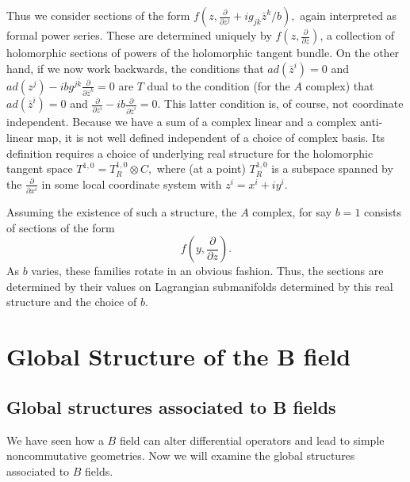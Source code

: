 \documentclass[a4paper,11pt]{amsart}
\begin{document}
Thus we consider sections of the form 
$f(z,\frac{\partial}{\partial z^j}+ig_{j\bar k}\bar z^k/b),$ 
again interpreted as formal power series.
These are determined uniquely by $f(z,\frac{\partial}{\partial z})$, 
a collection of holomorphic sections of powers of the holomorphic tangent
 bundle. On the other hand, if we now work backwards, the conditions that 
$ad(\bar z^i) = 0$ and
 $ad(z^j) - ibg^{j\bar k}\frac{\partial}{\partial \bar z^k} = 0$ are $T$ 
dual to the condition (for the $A$ complex) that 
$ad(\bar z^i) = 0$ and 
$\frac{\partial}{\partial z^i} - ib\frac{\partial}{\partial \bar z^i} = 0$. 
This latter condition is, of course, not coordinate independent. Because we 
have a sum of a complex linear and a complex anti-linear map, it is not well
 defined independent of a choice of complex basis. Its definition requires a 
 choice of underlying real structure for the
holomorphic tangent space $T^{1,0} = T_R^{1,0}\otimes C,$ where (at a point)
$T^{1,0}_R$ is a subspace spanned by the $\frac{\partial}{\partial x^i}$
 in some local coordinate system with $z^i = x^i+iy^i$. 
 
Assuming the existence of such a structure, the $A$ complex, for say $b = 1$
consists of  sections of the form 
$$f(y,\frac{\partial}{\partial z}).$$ 
As $b$ varies, these families rotate in an obvious fashion.
Thus, the sections are determined by their values on Lagrangian submanifolds
determined by this real structure and the choice of $b$. 
 
\section{Global Structure of the B field}\label{geomB}
\subsection{Global structures associated to B fields}
We have seen how a $B$ field can alter differential operators and lead to simple 
noncommutative geometries. Now we will examine the global structures associated
to $B$ fields. 
\end{document}
